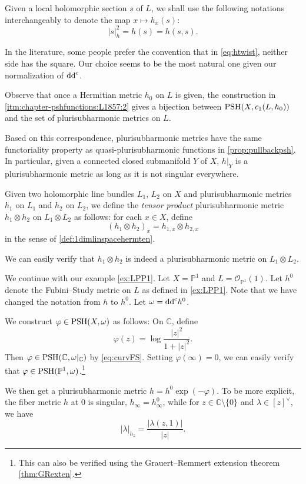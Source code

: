 Given a local holomorphic section $s$ of $L$, we shall use the following notations interchangeably to denote the map $x\mapsto h_x(s)$:
\[
|s|^2_h=h(s)=h(s,s).
\]

\begin{remark}\label{rmk:pshfunctions:L1864}
    In the literature, some people prefer the convention that in \eqref{eq:htwist}, neither side has the square. Our choice seems to be the most natural one given our normalization of $\mathrm{dd}^{\mathrm{c}}$.
\end{remark}

Observe that once a Hermitian metric $h_0$ on $L$ is given, the construction in \ref{itm:chapter-pshfunctions:L1857:2} gives a bijection between $\mathrm{PSH}(X,c_1(L,h_0))$ and the set of plurisubharmonic metrics on $L$.

Based on this correspondence, plurisubharmonic metrics have the same functoriality property as quasi-plurisubharmonic functions in \cref{prop:pullbackpsh}. In particular, given a connected closed submanifold $Y$ of $X$, $h|_Y$ is a plurisubharmonic metric as long as it is not singular everywhere.

\begin{definition}\label{def:tensorprodpshmetric}
    Given two holomorphic line bundles $L_1$, $L_2$ on $X$ and plurisubharmonic metrics $h_1$ on $L_1$ and $h_2$ on $L_2$, we define the \emph{tensor product} plurisubharmonic metric $h_1\otimes h_2$ on $L_1\otimes L_2$ as follows: for each $x\in X$, define
    \[
        (h_1\otimes h_2)_x=h_{1,x}\otimes h_{2,x}
    \]
    in the sense of \cref{def:1dimlinspacehermten}.
\end{definition}
We can easily verify that $h_1\otimes h_2$ is indeed a plurisubharmonic metric on $L_1\otimes L_2$.

\begin{example}\label{ex:logsingP1}
    We continue with our example \cref{ex:LPP1}. Let $X=\mathbb{P}^1$ and $L=\mathcal{O}_{\mathbb{P}^1}(1)$. Let $h^0$ denote the Fubini--Study metric on $L$ as defined in \cref{ex:LPP1}. Note that we have changed the notation from $h$ to $h^0$. Let $\omega=\mathrm{dd}^{\mathrm{c}} h^0$.

    We construct $\varphi\in \mathrm{PSH}(X,\omega)$ as follows: On $\mathbb{C}$, define
    \begin{equation}\label{eq:logsingP1ex}
    \varphi(z)=\log \frac{|z|^2}{1+|z|^2}.
    \end{equation}
    Then $\varphi\in \mathrm{PSH}(\mathbb{C},\omega|_{\mathbb{C}})$ by \eqref{eq:curvFS}. Setting $\varphi(\infty)=0$, we can easily verify that $\varphi\in \mathrm{PSH}(\mathbb{P}^1,\omega)$.\footnote{This can also be verified using the Grauert--Remmert extension theorem \cref{thm:GRexten}.}

    We then get a plurisubharmonic metric $h=h^0\exp(-\varphi)$. To be more explicit, the fiber metric $h$ at $0$ is singular, $h_{\infty}=h^0_{\infty}$, while for $z\in \mathbb{C}\setminus \{0\}$ and $\lambda\in [z]^{\vee}$, we have
    \[
    |\lambda|_{h_z}=\frac{|\lambda(z,1)|}{|z|}.
    \]
\end{example}


